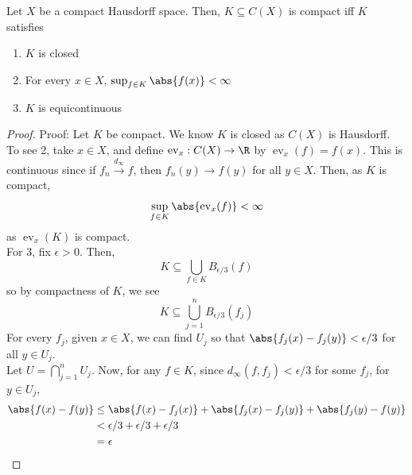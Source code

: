 \begin{theorem}
    Let $X$ be a compact Hausdorff space. Then, $K \subseteq C(X)$ is compact iff $K$ satisfies
    \begin{enumerate}
        \item $K$ is closed
        \item For every $x \in X$, $\sup_{f \in K} \abs{f(x)} < \infty$
        \item $K$ is equicontinuous
    \end{enumerate}
\end{theorem}
\begin{proof}{Proof:}
    Let $K$ be compact. We know $K$ is closed as $C(X)$ is Hausdorff.\\

    To see 2, take $x \in X$, and define $\operatorname{ev}_x : C(X) \to \R$ by $\operatorname{ev}_x(f) = f(x)$. This is continuous since if $f_n \xrightarrow{d_{\infty}} f$, then $f_n(y) \to f(y)$ for all $y \in X$. Then, as $K$ is compact,
    \[ \sup_{f \in K} \abs{\operatorname{ev}_x(f)} < \infty \]
    as $\operatorname{ev}_x(K)$ is compact.\\

    For 3, fix $\epsilon > 0$. Then,
    \[ K \subseteq \bigcup_{f \in K} B_{\epsilon/3}(f) \]
    so by compactness of $K$, we see
    \[ K \subseteq \bigcup_{j = 1}^{n} B_{\epsilon/3}(f_j) \]
    For every $f_j$, given $x \in X$, we can find $U_j$ so that $\abs{f_j(x) - f_j(y)} < \epsilon/3$ for all $y \in U_j$.\\

    Let $U = \bigcap_{j = 1}^{n} U_j$. Now, for any $f \in K$, since $d_{\infty}(f, f_j) < \epsilon/3$ for some $f_j$, for $y \in U_j$,
    \begin{align*}
        \abs{f(x) - f(y)} &\leq \abs{f(x) - f_j(x)} + \abs{f_j(x) - f_j(y)} + \abs{f_j(y) - f(y)}\\
        &< \epsilon/3 + \epsilon/3 + \epsilon/3\\
        &= \epsilon
    \end{align*}


\end{proof}
